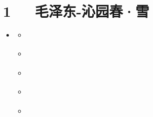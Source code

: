 \documentclass[letterpaper,12pt,english]{sphinxmanual}
\begin{document}
\chapter{1   毛泽东-沁园春·雪}
\label{\detokenize{p01_u6563_u6587/_u6bdb_u6cfd_u4e1c-_u6c81_u56ed_u6625_xb7_u96ea:id1}}\label{\detokenize{p01_u6563_u6587/_u6bdb_u6cfd_u4e1c-_u6c81_u56ed_u6625_xb7_u96ea::doc}}
\begin{sphinxShadowBox}
\begin{itemize}
\item {} 
\label{\detokenize{p01_u6563_u6587/_u6bdb_u6cfd_u4e1c-_u6c81_u56ed_u6625_xb7_u96ea:id8}}{\hyperref[\detokenize{p01_u6563_u6587/_u6bdb_u6cfd_u4e1c-_u6c81_u56ed_u6625_xb7_u96ea:id1}]{}}
\begin{itemize}
\item {} 
\label{\detokenize{p01_u6563_u6587/_u6bdb_u6cfd_u4e1c-_u6c81_u56ed_u6625_xb7_u96ea:id9}}{\hyperref[\detokenize{p01_u6563_u6587/_u6bdb_u6cfd_u4e1c-_u6c81_u56ed_u6625_xb7_u96ea:id3}]{}}

\item {} 
\label{\detokenize{p01_u6563_u6587/_u6bdb_u6cfd_u4e1c-_u6c81_u56ed_u6625_xb7_u96ea:id10}}{\hyperref[\detokenize{p01_u6563_u6587/_u6bdb_u6cfd_u4e1c-_u6c81_u56ed_u6625_xb7_u96ea:id4}]{}}

\item {} 
\label{\detokenize{p01_u6563_u6587/_u6bdb_u6cfd_u4e1c-_u6c81_u56ed_u6625_xb7_u96ea:id11}}{\hyperref[\detokenize{p01_u6563_u6587/_u6bdb_u6cfd_u4e1c-_u6c81_u56ed_u6625_xb7_u96ea:id5}]{}}

\item {} 
\label{\detokenize{p01_u6563_u6587/_u6bdb_u6cfd_u4e1c-_u6c81_u56ed_u6625_xb7_u96ea:id12}}{\hyperref[\detokenize{p01_u6563_u6587/_u6bdb_u6cfd_u4e1c-_u6c81_u56ed_u6625_xb7_u96ea:id6}]{}}

\item {} 
\label{\detokenize{p01_u6563_u6587/_u6bdb_u6cfd_u4e1c-_u6c81_u56ed_u6625_xb7_u96ea:id13}}{\hyperref[\detokenize{p01_u6563_u6587/_u6bdb_u6cfd_u4e1c-_u6c81_u56ed_u6625_xb7_u96ea:id7}]{}}

\end{itemize}

\end{itemize}
\end{sphinxShadowBox}
\end{document}
